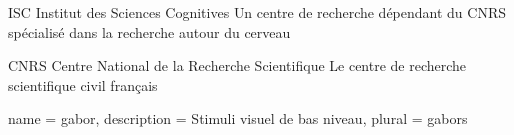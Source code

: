   {ISC}
  {Institut des Sciences Cognitives}
  {Un centre de recherche dépendant du \gls{CNRS} spécialisé dans la recherche autour du cerveau}

  {CNRS}
  {Centre National de la Recherche Scientifique}
  {Le centre de recherche scientifique civil français}

 {
  name = gabor,
  description = {Stimuli visuel de bas niveau},
  plural = gabors
}